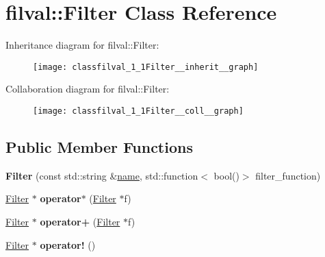 \hypertarget{classfilval_1_1Filter}{}\section{filval\+:\+:Filter Class Reference}
\label{classfilval_1_1Filter}


Inheritance diagram for filval\+:\+:Filter\+:
\nopagebreak
\begin{figure}[H]
\begin{center}
\leavevmode
\texttt{[image: classfilval\_1\_1Filter\_\_inherit\_\_graph]}
\end{center}
\end{figure}


Collaboration diagram for filval\+:\+:Filter\+:
\nopagebreak
\begin{figure}[H]
\begin{center}
\leavevmode
\texttt{[image: classfilval\_1\_1Filter\_\_coll\_\_graph]}
\end{center}
\end{figure}
\subsection*{Public Member Functions}
\begin{DoxyCompactItemize}
\item 
\hypertarget{classfilval_1_1Filter_a13771698fb0fddb05503db86ea0dfec8}{}\label{classfilval_1_1Filter_a13771698fb0fddb05503db86ea0dfec8} 
{\bfseries Filter} (const std\+::string \&\hyperlink{classfilval_1_1GenValue_a007e38c03ee041c2a657afa3d6e91ab1}{name}, std\+::function$<$ bool()$>$ filter\+\_\+function)
\item 
\hypertarget{classfilval_1_1Filter_a72bb2872f67234fea0791ebfc2647b2f}{}\label{classfilval_1_1Filter_a72bb2872f67234fea0791ebfc2647b2f} 
\hyperlink{classfilval_1_1Filter}{Filter} $\ast$ {\bfseries operator$\ast$} (\hyperlink{classfilval_1_1Filter}{Filter} $\ast$f)
\item 
\hypertarget{classfilval_1_1Filter_adb180778bc337de16c5355a62a193319}{}\label{classfilval_1_1Filter_adb180778bc337de16c5355a62a193319} 
\hyperlink{classfilval_1_1Filter}{Filter} $\ast$ {\bfseries operator+} (\hyperlink{classfilval_1_1Filter}{Filter} $\ast$f)
\item 
\hypertarget{classfilval_1_1Filter_a9ab1886e0d7408744f208be43891ff49}{}\label{classfilval_1_1Filter_a9ab1886e0d7408744f208be43891ff49} 
\hyperlink{classfilval_1_1Filter}{Filter} $\ast$ {\bfseries operator!} ()
\end{DoxyCompactItemize}
